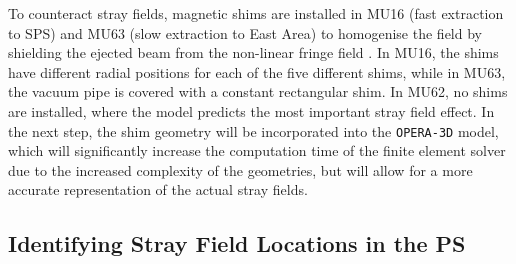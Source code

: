 To counteract stray fields, magnetic shims are installed in MU16 (fast extraction to SPS) and MU63 (slow extraction to East Area) to homogenise the field by shielding the ejected beam from the non-linear fringe field \cite{zickler_influence_nodate}. In MU16, the shims have different radial positions for each of the five different shims, while in MU63, the vacuum pipe is covered with a constant rectangular shim. In MU62, no shims are installed, where the model predicts the most important stray field effect. In the next step, the shim geometry will be incorporated into the \texttt{OPERA-3D} model, which will significantly increase the computation time of the finite element solver due to the increased complexity of the geometries, but will allow for a more accurate representation of the actual stray fields.








\subsection{Identifying Stray Field Locations in the PS}

